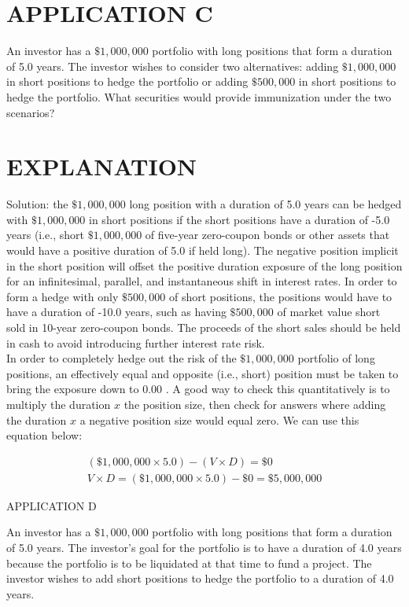 \documentclass[11pt]{article}
\begin{document}
\section*{APPLICATION C}
An investor has a $\$ 1,000,000$ portfolio with long positions that form a duration of 5.0 years. The investor wishes to consider two alternatives: adding $\$ 1,000,000$ in short positions to hedge the portfolio or adding $\$ 500,000$ in short positions to hedge the portfolio. What securities would provide immunization under the two scenarios?

\section*{EXPLANATION}
Solution: the $\$ 1,000,000$ long position with a duration of 5.0 years can be hedged with $\$ 1,000,000$ in short positions if the short positions have a duration of -5.0 years (i.e., short $\$ 1,000,000$ of five-year zero-coupon bonds or other assets that would have a positive duration of 5.0 if held long). The negative position implicit in the short position will offset the positive duration exposure of the long position for an infinitesimal, parallel, and instantaneous shift in interest rates. In order to form a hedge with only $\$ 500,000$ of short positions, the positions would have to have a duration of -10.0 years, such as having $\$ 500,000$ of market value short sold in 10-year zero-coupon bonds. The proceeds of the short sales should be held in cash to avoid introducing further interest rate risk.\\
In order to completely hedge out the risk of the $\$ 1,000,000$ portfolio of long positions, an effectively equal and opposite (i.e., short) position must be taken to bring the exposure down to 0.00 . A good way to check this quantitatively is to multiply the duration $x$ the position size, then check for answers where adding the duration $x$ a negative position size would equal zero. We can use this equation below:

$$
\begin{gathered}
(\$ 1,000,000 \times 5.0)-(V \times D)=\$ 0 \\
V \times D=(\$ 1,000,000 \times 5.0)-\$ 0=\$ 5,000,000
\end{gathered}
$$

APPLICATION D

An investor has a $\$ 1,000,000$ portfolio with long positions that form a duration of 5.0 years. The investor's goal for the portfolio is to have a duration of 4.0 years because the portfolio is to be liquidated at that time to fund a project. The investor wishes to add short positions to hedge the portfolio to a duration of 4.0 years.
\end{document}
